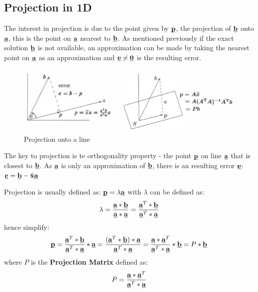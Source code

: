 \documentclass[10pt,a4paper]{article}
\begin{document}
\subsection{Projection in 1D}

The interest in projection is due to the point given by $\textbf{\underbar{p}}$, the projection of
$\textbf{\underbar{b}}$ onto $\textbf{\underbar{a}}$, this is the point on $\textbf{\underbar{a}}$
nearest to $\textbf{\underbar{b}}$. As mentioned previously if the exact solution
$\textbf{\underbar{b}}$ is not available, an approximation can be made by taking the nearest point
on $\textbf{\underbar{a}}$ as an approximation  and $\textbf{\underbar{e}} \neq
\textbf{\underbar{0}}$ is the resulting error. \par
\begin{figure} [h!]
	\centering
	\includegraphics[scale=0.7]{Projection_1D.JPG}
	\caption{Projection onto a line}
\end{figure}
The key to projection is te orthogonality property - the point $\textbf{\underbar{p}}$ on line
$\textbf{\underbar{a}}$ that is closest to $\textbf{\underbar{b}}$. As $\textbf{\underbar{a}}$ is
only an approximation of $\textbf{\underbar{b}}$, there is an resulting error
$\textbf{\underbar{e}}$:
$\textbf{\underbar{e}}=\textbf{\underbar{b}}-\hat{\textbf{x}}\textbf{\underbar{a}}$ \par 
Projection is usually defined as: $\textbf{\underbar{p}} = \lambda\textbf{\underbar{a}}$ with
$\lambda$ can be defined as: 
\begin{align*}
	\lambda =
	\frac{\textbf{\underbar{a}}*\textbf{\underbar{b}}}{\textbf{\underbar{a}}*\textbf{\underbar{a}}}=\frac{\textbf{\underbar{a}}^T*\textbf{\underbar{b}}}{\textbf{\underbar{a}}^T*\textbf{\underbar{a}}}
\end{align*}
hence simplify:
\begin{align*}
	\textbf{\underbar{p}}=\frac{\textbf{\underbar{a}}^T*\textbf{\underbar{b}}}{\textbf{\underbar{a}}^T*\textbf{\underbar{a}}}*\textbf{\underbar{a}}=\frac{(\textbf{\underbar{a}}^T*\textbf{\underbar{b}})*\textbf{\underbar{a}}}{\textbf{\underbar{a}}^T*\textbf{\underbar{a}}}
	=
	\frac{\textbf{\underbar{a}}*\textbf{\underbar{a}}^T}{\textbf{\underbar{a}}^T*\textbf{\underbar{a}}}*\textbf{\underbar{b}}=P*\textbf{\underbar{b}}
\end{align*}
where $P$ is the \textbf{Projection Matrix} defined as:
$$P=\frac{\textbf{\underbar{a}}*\textbf{\underbar{a}}^T}{\textbf{\underbar{a}}^T*\textbf{\underbar{a}}}$$
\end{document}
